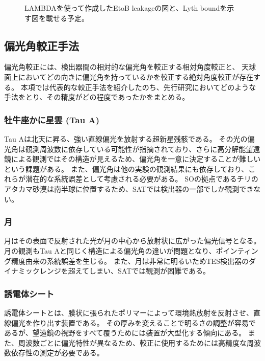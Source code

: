 \documentclass[../../main.tex]{subfiles}
\begin{document}
\begin{figure}[H]
    \centering
    \caption{LAMBDAを使って作成したEtoB leakageの図と、Lyth boundを示す図を載せる予定。}
\end{figure}

\subsection{偏光角較正手法}
偏光角較正には、検出器間の相対的な偏光角を較正する相対角度較正と、
天球面上においてどの向きに偏光角を持っているかを較正する絶対角度較正が存在する。
本項では代表的な較正手法を紹介したのち、先行研究においてどのような手法をとり、その精度がどの程度であったかをまとめる。
\subsubsection{牡牛座かに星雲 (Tau A)}
Tau Aは北天に昇る、強い直線偏光を放射する超新星残骸である。
その光の偏光角は観測周波数に依存している可能性が指摘されており、さらに高分解能望遠鏡による観測ではその構造が見えるため、偏光角を一意に決定することが難しいという課題がある。
また、偏光角は他の実験の観測結果にも依存しており、これらが潜在的な系統誤差として考慮される必要がある。
SOの拠点であるチリのアタカマ砂漠は南半球に位置するため、SATでは検出器の一部でしか観測できない。
\subsubsection{}
\subsubsection{月}
月はその表面で反射された光が月の中心から放射状に広がった偏光信号となる。
月の観測もTau Aと同じく構造による偏光角の違いが問題となり、ポインティング精度由来の系統誤差を生じる。
また、月は非常に明るいためTES検出器のダイナミックレンジを超えてしまい、SATでは観測が困難である。
\subsubsection{誘電体シート}
誘電体シートとは、膜状に張られたポリマーによって環境熱放射を反射させ、直線偏光を作り出す装置である。
その厚みを変えることで明るさの調整が容易であるが、望遠鏡の視野をすべて覆うためには装置が大型化する傾向にある。
また、周波数ごとに偏光特性が異なるため、較正に使用するためには高精度な周波数依存性の測定が必要である。
\end{document}
